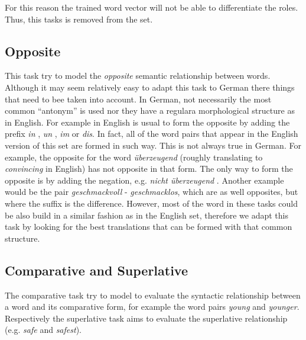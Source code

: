 For this reason the trained word vector will not be able to differentiate the
roles. Thus, this tasks is removed from the set. 

\subsection{Opposite}
\label{sec:sub_sec_opposite}
This task try to model the \emph{opposite} semantic relationship between words.
Although it may seem relatively easy to adapt this task to German there
things that need to bee taken into account. In German,  not necessarily the
most common ``antonym'' is used nor they have a regulara morphological
structure as in English. For example  in English is usual to form the
opposite by adding the prefix \textit{in} ,  \textit{un} , \textit{im} or
\textit{dis}. In fact, all of the word pairs that appear in the English
version of this set are formed in such way. This is not always true in
German. For example, the opposite for the word  \textit{\"{u}berzeugend} (roughly
translating to \emph{convincing} in English) has not opposite in that form.
The only way to form the opposite is by adding the negation, e.g.
\textit{nicht  \"{u}berzeugend }. Another example would be the pair
\textit{geschmackvoll} - \textit{ geschmacklos}, which are as well opposites,
but where the suffix is the difference.
However, most of the word in these tasks could be also build in a similar
fashion as in the English set, therefore we adapt this task by looking for
the best translations that can be formed with that common structure.

\subsection{Comparative and Superlative}
\label{sec:sub_sec_comparative_sup}

The comparative task  try to model to evaluate the syntactic relationship between a word
and its comparative form, for example the word pairs  \textit{young} and
\textit{younger}. Respectively the superlative task aims to evaluate the
superlative relationship  (e.g. \textit{safe}  and \textit{safest}). 

